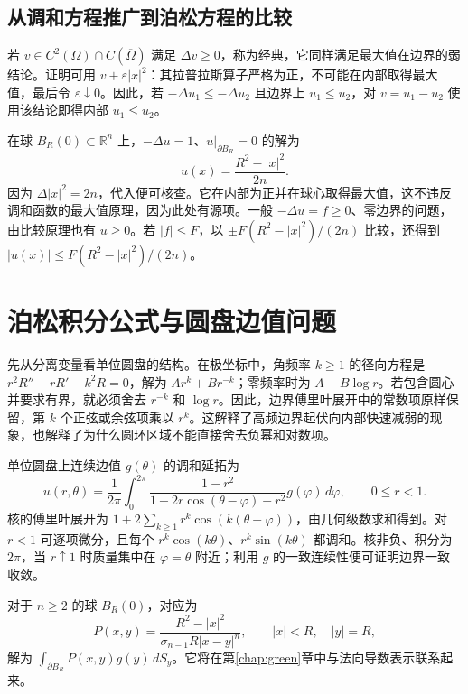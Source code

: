 \documentclass[UTF8,12pt,a4paper,fontset=fandol]{ctexbook}
\begin{document}
\subsection{从调和方程推广到泊松方程的比较}
若 $v\in C^2(\Omega)\cap C(\overline\Omega)$ 满足 $\Delta v\ge0$，称为经典，它同样满足最大值在边界的弱结论。证明可用 $v+\varepsilon|x|^2$：其拉普拉斯算子严格为正，不可能在内部取得最大值，最后令 $\varepsilon\downarrow0$。因此，若 $-\Delta u_1\le-\Delta u_2$ 且边界上 $u_1\le u_2$，对 $v=u_1-u_2$ 使用该结论即得内部 $u_1\le u_2$。

\begin{example}[正源项产生非负解]
在球 $B_R(0)\subset\mathbb R^n$ 上，$-\Delta u=1$、$u|_{\partial B_R}=0$ 的解为
\[
 u(x)=\frac{R^2-|x|^2}{2n}.
\]
因为 $\Delta|x|^2=2n$，代入便可核查。它在内部为正并在球心取得最大值，这不违反调和函数的最大值原理，因为此处有源项。一般 $-\Delta u=f\ge0$、零边界的问题，由比较原理也有 $u\ge0$。若 $|f|\le F$，以 $\pm F(R^2-|x|^2)/(2n)$ 比较，还得到 $|u(x)|\le F(R^2-|x|^2)/(2n)$。
\end{example}

\section{泊松积分公式与圆盘边值问题}
先从分离变量看单位圆盘的结构。在极坐标中，角频率 $k\ge1$ 的径向方程是 $r^2R''+rR'-k^2R=0$，解为 $Ar^k+Br^{-k}$；零频率时为 $A+B\log r$。若包含圆心并要求有界，就必须舍去 $r^{-k}$ 和 $\log r$。因此，边界傅里叶展开中的常数项原样保留，第 $k$ 个正弦或余弦项乘以 $r^k$。这解释了高频边界起伏向内部快速减弱的现象，也解释了为什么圆环区域不能直接舍去负幂和对数项。

单位圆盘上连续边值 $g(\theta)$ 的调和延拓为
\begin{equation}
 u(r,\theta)=\frac1{2\pi}\int_0^{2\pi}
 \frac{1-r^2}{1-2r\cos(\theta-\varphi)+r^2}g(\varphi)\,d\varphi,
 \qquad 0\le r<1.
 \label{eq:poisson-disk}
\end{equation}
核的傅里叶展开为 $1+2\sum_{k\ge1}r^k\cos(k(\theta-\varphi))$，由几何级数求和得到。对 $r<1$ 可逐项微分，且每个 $r^k\cos(k\theta)$、$r^k\sin(k\theta)$ 都调和。核非负、积分为 $2\pi$，当 $r\uparrow1$ 时质量集中在 $\varphi=\theta$ 附近；利用 $g$ 的一致连续性便可证明边界一致收敛。

对于 $n\ge2$ 的球 $B_R(0)$，对应为
\[
 P(x,y)=\frac{R^2-|x|^2}{\sigma_{n-1}R|x-y|^n},\qquad |x|<R,\quad |y|=R,
\]
解为 $\int_{\partial B_R}P(x,y)g(y)\,dS_y$。它将在第\ref{chap:green}章中与法向导数表示联系起来。
\end{document}
